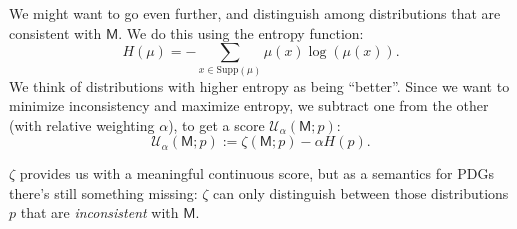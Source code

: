 \documentclass{article}
\newcommand{\sfM}{\mathsf M}
\newcommand{\MN}{PDG}
\newcommand{\MNs}{\MN s}
\numberwithin{equation}{section}
\begin{document}
We might want to go even further, and distinguish among distributions
that are consistent with $\sfM$.
We do this using the entropy function:
$$H(\mu) =-\sum_{x \in \mathrm{Supp}(\mu)} \mu(x) \log(\mu(x)).$$ 
We think of distributions with higher entropy as being ``better''.
Since we want to minimize inconsistency and maximize entropy, we
subtract one from the other (with relative weighting $\alpha$), to get
a score $\mathcal U_\alpha(\sfM; p)$:
	\begin{equation}
		\mathcal U_\alpha(\sfM; p) := \zeta(\sfM;p) - \alpha
                H(p). \label{eq:freeenergy-weighted} 
	\end{equation} 



$\zeta$ provides us with a meaningful continuous score, but as
a semantics for \MNs\, there's still something missing: $\zeta$ can
only distinguish between those distributions $p$ that are
        \emph{inconsistent} with $\sfM$.
    
\end{document}
